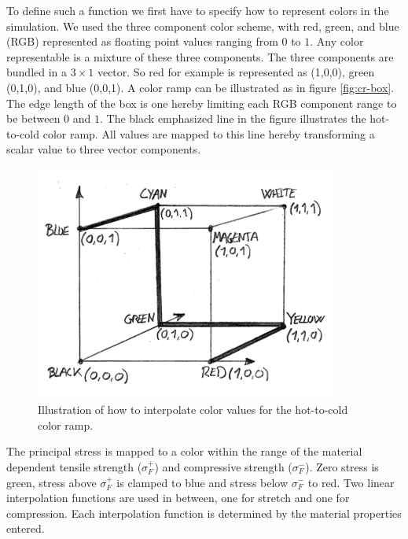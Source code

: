 To define such a function we first have to specify how to represent
colors in the simulation. We used the three component color scheme,
with red, green, and blue (RGB) represented as floating point values
ranging from $0$ to $1$. Any color representable is a mixture of these three
components. 
%
The three components are bundled in a $3 \times 1$ vector. So red for
example is represented as (1,0,0), green (0,1,0), and blue (0,0,1).
%
A color ramp can be illustrated as in
figure \vref{fig:cr-box}. The edge length of the box is one hereby
limiting each RGB component range to be between $0$ and $1$.
The black emphasized line in the figure illustrates the hot-to-cold
color ramp. All values are mapped to this line hereby transforming
a scalar value to three vector components. 

\begin{figure}
  \centering
  \includegraphics[width=10cm]{./images/helper_tools_color_ramp_box.png}
\caption{Illustration of how to interpolate color values for the hot-to-cold color ramp.}
\label{fig:cr-box}
\end{figure}

The principal stress is mapped to a color within the range of the
material dependent tensile strength ($\sigma^+_F$) and compressive
strength ($\sigma^-_F$). Zero stress is green, stress above
$\sigma^+_F$ is clamped to blue and stress below $\sigma^-_F$ to red.
Two linear interpolation functions are used in between, one for stretch and
one for compression. Each interpolation function is determined by the
material properties entered. 


